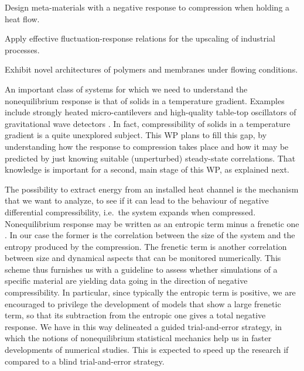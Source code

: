 \begin{workpackage}[id=WPcompress,wphases=0-48,
  short=Nonequilibrium compressibility, %
  title=Nonequilibrium compressibility, %
  lead=UNIPD,
  UNIPDRM=72,
  KULRM=12]

\newrefsection

\begin{wpobjectives}
  \begin{compactitem}
  \item Design meta-materials with a negative response to compression when holding a heat flow.
  \item Apply effective fluctuation-response relations for the upscaling of industrial processes.
  \item Exhibit novel architectures of polymers and membranes under flowing conditions.
  \end{compactitem}
\end{wpobjectives}

\begin{wpdescription}

An important class of systems for which we need to understand the nonequilibrium response is that of solids 
in a temperature gradient. Examples include strongly
heated micro-cantilevers \cite{AGBB15} and high-quality table-top oscillators of gravitational wave detectors \cite{Cet13}.
In fact, compressibility of solids in a temperature gradient is a quite unexplored subject.
This WP plans to fill this gap, by understanding how the response to compression takes place and how it
may be predicted by just knowing suitable (unperturbed) steady-state correlations.
That knowledge is important for a second, main stage of this WP, as explained next.


The possibility to extract energy from an installed heat channel is the mechanism that we want to
analyze, to see if it can lead to the behaviour of negative differential compressibility,
i.e.~the system expands when compressed. 
Nonequilibrium response may be written as an entropic term minus a frenetic one \cite{BMW09}.
In our case the former is the correlation between the size of the system and the entropy produced by the compression.
The frenetic term is another correlation between size and dynamical aspects that can be monitored numerically.
This scheme thus furnishes us with a guideline to assess whether simulations of a specific material are yielding data 
going in the direction of negative compressibility. In particular, since typically the entropic term is positive, we
are encouraged to privilege the development of models that show a large frenetic term, so that its subtraction from
the entropic one gives a total negative response.
We have in this way delineated a guided trial-and-error strategy, in which the notions of 
nonequilibrium statistical mechanics help us in faster developments of numerical studies. This is expected to
speed up the research if compared to a blind trial-and-error strategy.



\end{wpdescription}
\end{workpackage}
